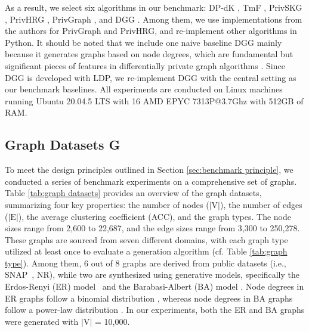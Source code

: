\documentclass[conference]{IEEEtran}
\theoremstyle{plain}
\begin{document}
As a result, we select six algorithms in our benchmark: DP-dK \cite{wang2013preserving}, TmF \cite{nguyen2015differentially}, PrivSKG \cite{mir2012differentially}, PrivHRG \cite{xiao2014differentially}, PrivGraph \cite{yuan2023privgraph}, and DGG \cite{qin2017generating}.
Among them, we use implementations from the authors for PrivGraph and PrivHRG, and re-implement other algorithms in Python.
It should be noted that we include one naive baseline DGG \cite{qin2017generating} mainly because it generates graphs based on node degrees, which are fundamental but significant pieces of features in differentially private graph algorithms \cite{ye2020lf, qin2017generating}. 
Since DGG is developed with LDP, we re-implement DGG with the central setting as our benchmark baselines.
All experiments are conducted on Linux machines running
Ubuntu 20.04.5 LTS with 16 AMD EPYC 7313P@3.7Ghz with 512GB of RAM.

\subsection{Graph Datasets \textbf{G}}
To meet the design principles outlined in Section \ref{sec:benchmark principle}, we conducted a series of benchmark experiments on a comprehensive set of graphs. 
Table \ref{tab:graph datasets} provides an overview of the graph datasets, summarizing four key properties: the number of nodes ($|\text{V}|$), the number of edges ($|\text{E}|$), the average clustering coefficient (ACC), and the graph types. 
The node sizes range from 2,600 to 22,687, and the edge sizes range from 3,300 to 250,278.
These graphs are sourced from seven different domains, with each graph type utilized at least once to evaluate a generation algorithm (cf. Table \ref{tab:graph type}). 
Among them, 6 out of 8 graphs are derived from public datasets (i.e., SNAP~\cite{snapnets}, NR\cite{nr}), while two are synthesized using generative models, specifically the Erdos-Renyi (ER) model~\cite{erd6s1960evolution} and the Barabasi-Albert (BA) model \cite{barabasi1999emergence}.
Node degrees in ER graphs follow a binomial distribution \cite{newman2001random}, whereas node degrees in BA graphs follow a power-law distribution \cite{bollobas2001degree}.
In our experiments, both the ER and BA graphs were generated with $|\text{V}|$ = 10,000.
\end{document}

